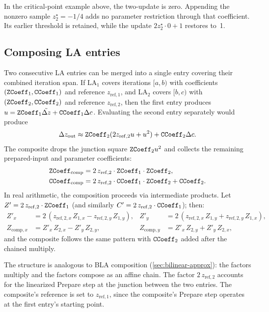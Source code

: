 In the critical-point example above, the two-update  is zero.
Appending the nonzero sample $z_2^\star=-1/4$ adds no parameter restriction
through that coefficient. Its earlier threshold is retained, while the update
$2z_2^\star\cdot0+1$ restores  to~1.

\subsection{Composing LA entries}
\label{sec:la-composite}

Two consecutive LA entries can be merged into a single entry covering their
combined iteration span.  If LA\(_1\) covers iterations \([a,b)\) with
coefficients \((\texttt{ZCoeff}_1, \texttt{CCoeff}_1)\) and reference
\(z_\mathrm{ref,1}\), and LA\(_2\) covers \([b,c)\) with
\((\texttt{ZCoeff}_2, \texttt{CCoeff}_2)\) and reference \(z_\mathrm{ref,2}\),
then the first entry produces
$u=\texttt{ZCoeff}_1\tilde{\Delta z}+\texttt{CCoeff}_1\Delta c$.
Evaluating the second entry separately would produce
\[
\Delta z_{\mathrm{out}}\approx
\texttt{ZCoeff}_2(2z_\mathrm{ref,2}u+u^2)
 +\texttt{CCoeff}_2\Delta c.
\]
The composite drops the junction square $\texttt{ZCoeff}_2u^2$ and collects
the remaining prepared-input and parameter coefficients:
\begin{align}
\texttt{ZCoeff}_\mathrm{comp}
  &= 2\,z_\mathrm{ref,2}\cdot\texttt{ZCoeff}_1\cdot\texttt{ZCoeff}_2,
  \label{eq:la-comp-z} \\
\texttt{CCoeff}_\mathrm{comp}
  &= 2\,z_\mathrm{ref,2}\cdot\texttt{CCoeff}_1\cdot\texttt{ZCoeff}_2
   + \texttt{CCoeff}_2.
  \label{eq:la-comp-c}
\end{align}
In real arithmetic, the composition proceeds via intermediate products.
Let $Z' = 2\,z_{\mathrm{ref},2} \cdot \texttt{ZCoeff}_1$ (and similarly
$C' = 2\,z_{\mathrm{ref},2} \cdot \texttt{CCoeff}_1$); then:
\begin{align}
Z'_x &= 2\,(z_{\mathrm{ref},2,x}\,Z_{1,x} - z_{\mathrm{ref},2,y}\,Z_{1,y}), &
Z'_y &= 2\,(z_{\mathrm{ref},2,x}\,Z_{1,y} + z_{\mathrm{ref},2,y}\,Z_{1,x}), \\
Z_{\mathrm{comp},x} &= Z'_x\,Z_{2,x} - Z'_y\,Z_{2,y}, &
Z_{\mathrm{comp},y} &= Z'_x\,Z_{2,y} + Z'_y\,Z_{2,x},
\end{align}
and the composite  follows the same pattern with
$\texttt{CCoeff}_2$ added after the chained multiply.

The structure is analogous to BLA composition (\cref{sec:bilinear-approx}):
the  factors multiply and the  factors compose
as an affine chain.  The factor \(2\,z_\mathrm{ref,2}\) accounts for
the linearized Prepare step at the junction between the two entries.
The composite's reference is set to \(z_\mathrm{ref,1}\), since the
composite's Prepare step operates at the first entry's starting point.

